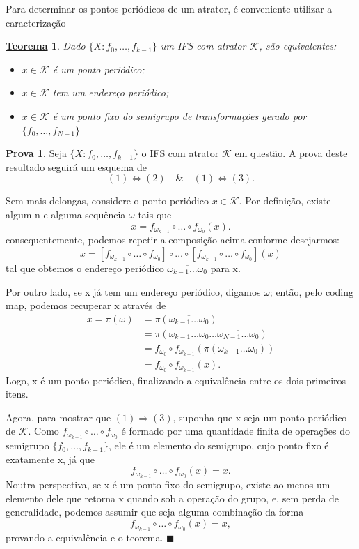 \documentclass[12pt]{article}
\newtheorem*{theorem*}{\underline{Teorema}}
\theoremstyle{definition}
\newtheorem*{proof*}{\underline{Prova}}
\renewcommand\qedsymbol{$\blacksquare$}
\begin{document}
Para determinar os pontos periódicos de um atrator, é conveniente utilizar a caracterização
\begin{theorem*}
	Dado \(\{X: f_{0}, \dotsc , f_{k-1}\}\) um IFS com atrator \(\mathcal{K}\), são equivalentes:
	\begin{itemize}
		\item[1)] \(x\in \mathcal{K}\) é um ponto periódico;
		\item[2)] \(x\in \mathcal{K}\) tem um endereço periódico;
		\item[3)] \(x\in \mathcal{K}\) é um ponto fixo do semigrupo de transformações gerado por \(\{f_{0}, \dotsc , f_{N-1}\}\)
	\end{itemize}
\end{theorem*}
\begin{proof*}
	Seja \(\{X: f_{0}, \dotsc , f_{k-1}\}\) o IFS com atrator \(\mathcal{K}\) em questão. A prova deste resultado seguirá um esquema de
	\[
		(1) \Longleftrightarrow (2) \quad\&\quad (1)\Longleftrightarrow (3).
	\]

	Sem mais delongas, considere o ponto periódico \(x\in \mathcal{K}\). Por definição, existe algum n e alguma sequência \(\omega \) tais que
	\[
		x = f_{\omega_{k-1}}\circ \dotsc \circ f_{\omega_0}(x).
	\]
	consequentemente, podemos repetir a composição acima conforme desejarmos:
	\[
		x = [f_{\omega_{k-1}}\circ \dotsc \circ f_{\omega_0}] \circ \dotsc \circ  [f_{\omega_{k-1}}\circ \dotsc \circ f_{\omega_0}](x)
	\]
	tal que obtemos o endereço periódico \(\overline{\omega_{k-1}\dotsc \omega_{0}}\) para x.

	Por outro lado, se x já tem um endereço periódico, digamos \(\omega\); então, pelo coding map, podemos recuperar x através de
	\begin{align*}
		x = \pi (\omega ) & = \pi (\overline{\omega_{k-1}\dotsc \omega_{0}})                                       \\
		                  & = \pi (\omega_{k-1}\dotsc  \omega_{0} \dotsc \overline{\omega_{N-1}\dotsc \omega_{0}}) \\
		                  & = f_{\omega_{0}}\circ f_{\omega_{k-1}}(\pi (\overline{\omega_{k-1}\dotsc \omega_{0}})) \\
		                  & = f_{\omega_{0}}\circ f_{\omega_{k-1}}(x).
	\end{align*}
	Logo, x é um ponto periódico, finalizando a equivalência entre os dois primeiros itens.

	Agora, para mostrar que \((1) \Rightarrow (3)\), suponha que x seja um ponto periódico de \(\mathcal{K}\). Como \(f_{\omega_{k-1}}\circ \dotsc \circ f_{\omega_{0}}\) é formado por uma quantidade finita de operações do semigrupo \(\{f_{0}, \dotsc , f_{k-1}\}\), ele é um elemento do semigrupo, cujo ponto fixo é exatamente x, já que
	\[
		f_{\omega_{k-1}} \circ \dotsc \circ f_{\omega_{0}} (x) = x.
	\]
	Noutra perspectiva, se x é um ponto fixo do semigrupo, existe ao menos um elemento dele que retorna x quando sob a operação do grupo, e, sem perda de generalidade, podemos assumir que seja alguma combinação da forma
	\[
		f_{\omega_{k-1}}\circ \dotsc \circ f_{\omega_{0}}(x) = x,
	\]
	provando a equivalência e o teorema. \qedsymbol
\end{proof*}
\end{document}
